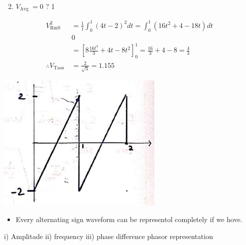 \documentclass[12pt, a4paper]{article}
\newcommand{\figwidth}{8cm}
\begin{document}
	\begin{enumerate}
		\setcounter{enumi}{1}
		\item $V_{\text {Avg }}=0$ ? 1
	\end{enumerate}

	$$
		\begin{aligned}
			V_{\text {RmS }}^{2}         & =\frac{1}{1} \int_{0}^{1}(4 t-2)^{2} d t=\int_{0}^{1}\left(16 t^{2}+4-18 t\right) d t \\
			                             & 0                                                                                     \\
			                             & =\left[8 \frac{16 t^{3}}{3}+4 t-8 t^{2}\right]_{0}^{1}=\frac{16}{3}+4-8=\frac{4}{3}   \\
			\therefore V_{\text {Taos }} & =\frac{2}{\sqrt{3}}=1.155
		\end{aligned}
	$$

	\begin{center}
		\includegraphics[max width=\figwidth]{2024_06_15_74bbabba7981675b0d49g-02}
	\end{center}

	\begin{itemize}
		\item Every alternating sign waveform can be representol completely if we hove.
	\end{itemize}

	i) Amplitade ii) frequency iii) phase difference phasor representation
\end{document}
